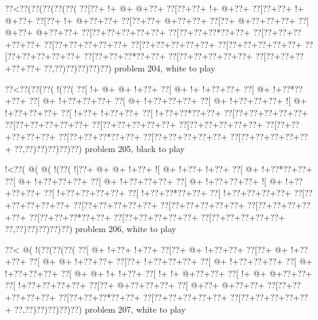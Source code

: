\vbox{\vbox{\goo
\0??<\0??(\0??(\0??(\0??(\0??(
\0??[\0??+\- !+\- @+\- @+\0??+
\0??[\0??+\0??+\- !+\- @+\0??+
\0??[\0??+\0??+\- !+\- @+\0??+
\0??[\0??+\- !+\- @+\0??+\0??+
\0??[\0??+\0??+\- @+\0??+\0??+
\0??[\0??+\- @+\0??+\0??+\0??+
\0??[\- @+\0??+\- @+\0??+\0??+
\0??[\0??+\0??+\0??+\0??+\0??+
\0??[\0??+\0??+\0??*\0??+\0??+
\0??[\0??+\0??+\0??+\0??+\0??+
\0??[\0??+\0??+\0??+\0??+\0??+
\0??[\0??+\0??+\0??+\0??+\0??+
\0??[\0??+\0??+\0??+\0??+\0??+
\0??[\0??+\0??+\0??+\0??+\0??+
\0??[\0??+\0??+\0??*\0??+\0??+
\0??[\0??+\0??+\0??+\0??+\0??+
\0??[\0??+\0??+\0??+\0??+\0??+
\0??,\0??)\0??)\0??)\0??)\0??)
}
\hfil problem 204, white to play\hfil\break
}

\vbox{\vbox{\goo
\0??<\0??(\0??(\0??(\- !(\0??(
\0??[\- !+\- @+\- @+\- !+\0??+
\0??[\- @+\- !+\- !+\0??+\0??+
\0??[\- @+\- !+\0??*\0??+\0??+
\0??[\- @+\- !+\0??+\0??+\0??+
\0??[\- @+\- !+\0??+\0??+\0??+
\0??[\- @+\- !+\0??+\0??+\0??+
\- ![\- @+\- !+\0??+\0??+\0??+
\0??[\- !+\0??+\- !+\0??+\0??+
\0??[\- !+\0??+\0??*\0??+\0??+
\0??[\0??+\0??+\0??+\0??+\0??+
\0??[\0??+\0??+\0??+\0??+\0??+
\0??[\0??+\0??+\0??+\0??+\0??+
\0??[\0??+\0??+\0??+\0??+\0??+
\0??[\0??+\0??+\0??+\0??+\0??+
\0??[\0??+\0??+\0??*\0??+\0??+
\0??[\0??+\0??+\0??+\0??+\0??+
\0??[\0??+\0??+\0??+\0??+\0??+
\0??,\0??)\0??)\0??)\0??)\0??)
}
\hfil problem 205, black to play\hfil\break
}

\vbox{\vbox{\goo
\- !<\0??(\- @(\- @(\- !(\0??(
\- ![\0??+\- @+\- @+\- !+\0??+
\- ![\- @+\- !+\0??+\- !+\0??+
\0??[\- @+\- !+\0??*\0??+\0??+
\0??[\- @+\- !+\0??+\0??+\0??+
\0??[\- @+\- !+\0??+\0??+\0??+
\0??[\- @+\- !+\0??+\0??+\0??+
\- ![\- @+\- !+\0??+\0??+\0??+
\0??[\- !+\0??+\0??+\0??+\0??+
\0??[\- !+\0??+\0??*\0??+\0??+
\0??[\- !+\0??+\0??+\0??+\0??+
\0??[\0??+\0??+\0??+\0??+\0??+
\0??[\0??+\0??+\0??+\0??+\0??+
\0??[\0??+\0??+\0??+\0??+\0??+
\0??[\0??+\0??+\0??+\0??+\0??+
\0??[\0??+\0??+\0??*\0??+\0??+
\0??[\0??+\0??+\0??+\0??+\0??+
\0??[\0??+\0??+\0??+\0??+\0??+
\0??,\0??)\0??)\0??)\0??)\0??)
}
\hfil problem 206, white to play\hfil\break
}

\vbox{\vbox{\goo
\0??<\- @(\- !(\0??(\0??(\0??(
\0??[\- @+\- !+\0??+\- !+\0??+
\0??[\0??+\- @+\- !+\0??+\0??+
\0??[\0??+\- @+\- !+\0??+\0??+
\0??[\- @+\- @+\- !+\0??+\0??+
\0??[\0??+\- !+\0??+\0??+\0??+
\0??[\- @+\- !+\0??+\0??+\0??+
\0??[\- @+\- !+\0??+\0??+\0??+
\0??[\- @+\- @+\- !+\- !+\0??+
\0??[\- !+\- !+\- @+\0??+\0??+
\0??[\- !+\- @+\- @+\0??+\0??+
\0??[\- !+\0??+\0??+\0??+\0??+
\0??[\0??+\- @+\0??+\0??+\0??+
\0??[\- @+\0??+\- @+\0??+\0??+
\0??[\0??+\0??+\0??+\0??+\0??+
\0??[\0??+\0??+\0??*\0??+\0??+
\0??[\0??+\0??+\0??+\0??+\0??+
\0??[\0??+\0??+\0??+\0??+\0??+
\0??,\0??)\0??)\0??)\0??)\0??)
}
\hfil problem 207, white to play\hfil\break
}

